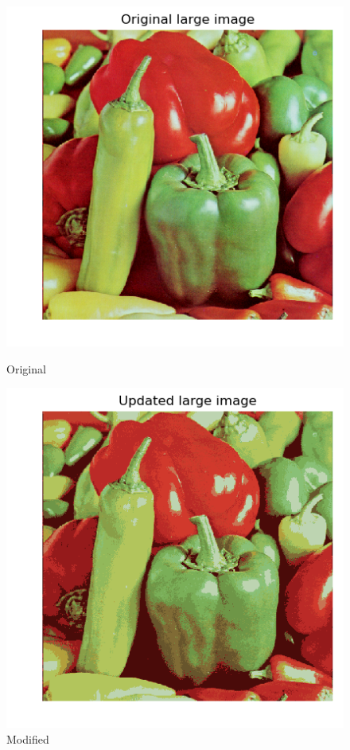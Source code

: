 \begin{answer}
\begin{figure}[here]
  \centering
  \begin{minipage}{0.7\textwidth}
  \includegraphics[width=\textwidth]{orig_large.png}
  \caption{Original}
  \end{minipage}
  \hfill
  \begin{minipage}{0.7\textwidth}
  \includegraphics[width=\textwidth]{updated_large.png}
  \caption{Modified}
  \end{minipage}
\end{figure}
\end{answer}
